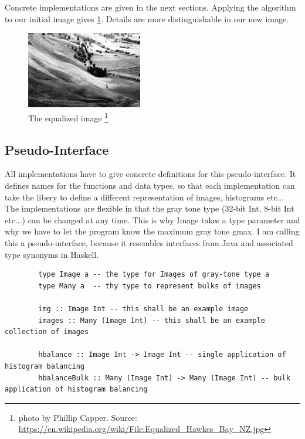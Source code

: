\documentclass{article}
\begin{document}
      Concrete implementations are given in the next sections.
      Applying the algorithm to our initial image gives \ref{fig:img-eq}. Details are more distinguishable in our new image.
      
      \begin{figure}[h]
        \centering
        \includegraphics[width=0.45\textwidth]{img-eq}
        \caption{The equalized image
        \footnote{photo by Phillip Capper. Source: \url{https://en.wikipedia.org/wiki/File:Equalized_Hawkes_Bay_NZ.jpg}}
        }
        \label{fig:img-eq}
      \end{figure}
      
    \subsection{Pseudo-Interface}
      All implementations have to give concrete definitions for this pseudo-interface.
      It defines names for the functions and data types, so that each implementation
      can take the libery to define a different representation of images, histograms etc...
      The implementations are flexible in that the gray tone type (32-bit Int, 8-bit Int etc...)
      can be changed at any time. This is why Image takes a type parameter and why we have to
      let the program know the maximum gray tone gmax. I am calling this a pseudo-interface,
      because it resembles interfaces from Java and associated type synonyms in Haskell.
      \begin{lstlisting}
        type Image a -- the type for Images of gray-tone type a
        type Many a  -- thy type to represent bulks of images

        img :: Image Int -- this shall be an example image
        images :: Many (Image Int) -- this shall be an example collection of images
        
        hbalance :: Image Int -> Image Int -- single application of histogram balancing
        hbalanceBulk :: Many (Image Int) -> Many (Image Int) -- bulk application of histogram balancing
      \end{lstlisting}
      
\end{document}
